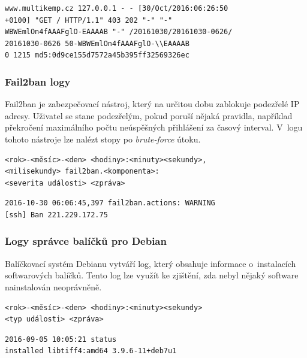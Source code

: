 \documentclass[thesis=B,czech]{FITthesis}[2012/06/26]
\begin{document}
\begin{lstlisting}[frame=single,caption=Příklad události (viz \texttt{modsec\_audit.log}),label=exampleMODSEC]
www.multikemp.cz 127.0.0.1 - - [30/Oct/2016:06:26:50 
+0100] "GET / HTTP/1.1" 403 202 "-" "-" 
WBWEmlOn4fAAAFglO-EAAAAB "-" /20161030/20161030-0626/
20161030-0626 50-WBWEmlOn4fAAAFglO-\\EAAAAB 
0 1215 md5:0d9ce155d7572a45b395ff32569326ec
\end{lstlisting}

\subsubsection{Fail2ban logy}
Fail2ban je zabezpečovací nástroj, který na určitou dobu zablokuje podezřelé IP adresy. Uživatel se stane podezřelým, pokud poruší nějaká pravidla, například překročení maximálního počtu neúspěšných přihlášení za časový interval. V~logu tohoto nástroje lze nalézt stopy po \textit{brute-force} útoku. 
\cite{Fail2BanSetup}

\begin{lstlisting}[frame=single,caption=Formát události z~fail2ban logu \cite{Fail2BanSetup},label=formatFAIL2BAN]
<rok>-<měsíc>-<den> <hodiny>:<minuty><sekundy>,
<milisekundy> fail2ban.<komponenta>: 
<severita události> <zpráva>
\end{lstlisting}


\begin{lstlisting}[frame=single,caption=Příklad události (viz \texttt{fail2ban.log}),label=exampleFAIL2BAN]
2016-10-30 06:06:45,397 fail2ban.actions: WARNING 
[ssh] Ban 221.229.172.75
\end{lstlisting}

\subsubsection{Logy správce balíčků pro Debian}
Balíčkovací systém Debianu vytváří log, který obsahuje informace o~instalacích softwarových balíčků. Tento log lze využít ke zjištění, zda nebyl nějaký software nainstalován neoprávněně.
\cite{dpkg}

\begin{lstlisting}[frame=single,caption=Formát události z~logu správce balíčků pro Debian \cite{dpkg},label=formatDPKG]
<rok>-<měsíc>-<den> <hodiny>:<minuty><sekundy> 
<typ události> <zpráva>
\end{lstlisting}

\begin{lstlisting}[frame=single,caption=Příklad události (viz \texttt{dpkg.log}),label=exampleDPKG]
2016-09-05 10:05:21 status 
installed libtiff4:amd64 3.9.6-11+deb7u1
\end{lstlisting}
\end{document}
